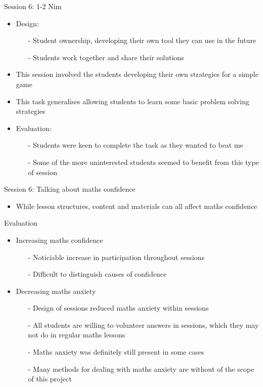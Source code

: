 \documentclass{beamer}  %
\begin{document}
\begin{frame}{Session 6: 1-2 Nim}
    \begin{itemize}
        \item Design:
        \begin{itemize}
            \item[-] Student ownership, developing their own tool they can use in the future
            \item[-] Students work together and share their solutions
        \end{itemize}
        \item This session involved the students developing their own strategies for a simple game
        \item This task generalises allowing students to learn some basic problem solving strategies
        \item Evaluation:
        \begin{itemize}
            \item[-] Students were keen to complete the task as they wanted to beat me
            \item[-] Some of the more uninterested students seemed to benefit from this type of session
        \end{itemize}
    \end{itemize}
\end{frame}

\begin{frame}{Session 6: Talking about maths confidence}
    \begin{itemize}
        \item While lesson structures, content and materials can all affect maths confidence
    \end{itemize}
\end{frame}

\begin{frame}{Evaluation}
    \begin{itemize}
        \item Increasing maths confidence
        \begin{itemize}
            \item[-] Noticiable increase in participation throughout sessions
            \item[-] Difficult to distinguish causes of confidence
        \end{itemize}
        \item Decreasing maths anxiety
        \begin{itemize}
            \item[-] Design of sessions reduced maths anxiety within sessions
            \item[-] All students are willing to volunteer answers in sessions, which they may not do in regular maths lessons
            \item[-] Maths anxiety was definitely still present in some cases 
            \item[-] Many methods for dealing with maths anxiety are without of the scope of this project
        \end{itemize}
    \end{itemize}


\end{frame}
\end{document}
